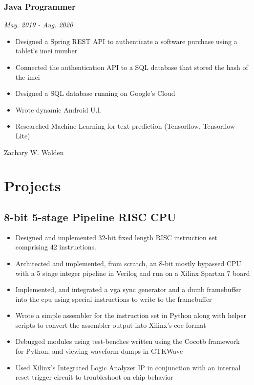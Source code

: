 \documentclass{article}
\begin{document}
\begin{spacing}{.5}
		\subsubsection{\large{Java Programmer}} \hfill \small{\textsl{May. 2019 - Aug. 2020}}
			\begin{itemize}[label=--,itemsep=-.35ex]
				\item \large{Designed a Spring REST API to authenticate a software purchase using a tablet's imei number}
				\item \large{Connected the authentication API to a SQL database that stored the hash of the imei}
				\item \large{Designed a SQL database running on Google's Cloud}
				\item \large{Wrote dynamic Android U.I.}
				\item \large{Researched Machine Learning for text prediction} \small{(Tensorflow, Tensorflow Lite)}
			\end{itemize}

\newpage

\begin{center}
	\begin{huge}
		Zachary W. Walden\\
	\end{huge}
\end{center}

\section{Projects}
	\subsection{8-bit 5-stage Pipeline RISC CPU \hfill {}}
		\begin{itemize}[label=--,itemsep=-.35ex]
			\item \large{Designed and implemented 32-bit fixed length RISC instruction set comprising 42 instructions.}
			\item \large{Architected and implemented, from scratch, an 8-bit mostly bypassed CPU with a 5 stage integer pipeline in Verilog and run on a Xilinx Spartan 7 board}
			\item \large{Implemented, and integrated a vga sync generator and a dumb framebuffer into the cpu using special instructions to write to the framebuffer}
			\item \large{Wrote a simple assembler for the instruction set in Python along with helper scripts to convert the assembler output into Xilinx's coe format}
			\item \large{Debugged modules using test-benches written using the Cocotb framework for Python, and viewing waveform dumps in GTKWave}
			\item \large{Used Xilinx's Integrated Logic Analyzer IP in conjunction with an internal reset trigger circuit to troubleshoot on chip behavior}
		\end{itemize}

\end{spacing}
\end{document}
